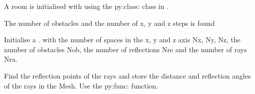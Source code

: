\documentclass[letterpaper,10pt,english]{sphinxmanual}
\begin{document}
\begin{fulllineitems}
\begin{itemize}
\end{itemize}

A room is initialised with  using the py:class:   class in {\hyperref[\detokenize{index:module-Room}]{}}.

The number of obstacles and the number of x, y and z steps is found

\begin{sphinxVerbatim}[commandchars=\\\{\}]
\end{sphinxVerbatim}

Initialise a .   {\hyperref[\detokenize{index:DictionarySparseMatrix.DS}]{}} with the   number of spaces in the x, y and z axis Nx, Ny, Nz, the number of   obstacles Nob, the number of reflections Nre and the number of rays Nra.

\begin{sphinxVerbatim}[commandchars=\\\{\}]
\end{sphinxVerbatim}

Find the reflection points of the rays and store the distance and   reflection angles of the rays in the Mesh. Use the   py:func: function.

\begin{sphinxVerbatim}[commandchars=\\\{\}]
 
\end{sphinxVerbatim}


\end{fulllineitems}
\end{document}
